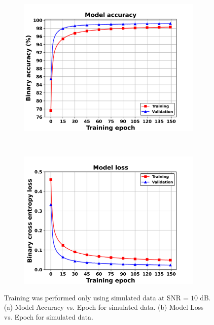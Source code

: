 \documentclass[journal]{IEEEtran}
\begin{document}
\begin{figure}[ht!]
    \captionsetup{justification=justified}
     \centering
     \begin{subfigure}[b]{0.48\textwidth}
         \centering
         \includegraphics[width=\textwidth]{Figures/Accuracy_FCN_3_512_sim_1638k_fading_SNR_10dB_slots_13_mux_ue_0_1_2_3_4_5_6_7_8_9_10_11_12.png}
         \caption{}
         \label{fig: acc_vs_epoch}
     \end{subfigure}
     \\
     \begin{subfigure}[b]{0.48\textwidth}
         \centering
         \includegraphics[width=\textwidth]{Figures/Loss_FCN_3_512_sim_1638k_fading_SNR_10dB_slots_13_mux_ue_0_1_2_3_4_5_6_7_8_9_10_11_12.png}
         \caption{}
         \label{fig: loss_vs_epoch}
     \end{subfigure}
        \caption{Training was performed only using simulated data at SNR = $10$ dB. (a) Model Accuracy vs. Epoch for simulated data. (b) Model Loss vs. Epoch for simulated data.}
        \label{fig: acc_loss_vs_epoch}
\end{figure}
\end{document}

